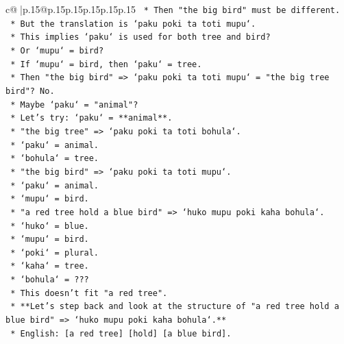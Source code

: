 \documentclass{article}
\begin{document}
{\begin{supertabular}{c@{$\;$}|p{.15\linewidth}@{}p{.15\linewidth}p{.15\linewidth}p{.15\linewidth}p{.15\linewidth}p{.15\linewidth}}
{{{\texttt{                        *   Then "the big bird" must be different.} \\
\texttt{                        *   But the translation is `paku poki ta toti mupu`.} \\
\texttt{                        *   This implies `paku` is used for both tree and bird?} \\
\texttt{                        *   Or `mupu` = bird?} \\
\texttt{                        *   If `mupu` = bird, then `paku` = tree.} \\
\texttt{                        *   Then "the big bird" => `paku poki ta toti mupu` = "the big tree bird"? No.} \\
\texttt{                        *   Maybe `paku` = "animal"?} \\
\texttt{                        *   Let's try: `paku` = **animal**.} \\
\texttt{                        *   "the big tree" => `paku poki ta toti bohula`.} \\
\texttt{                            *   `paku` = animal.} \\
\texttt{                            *   `bohula` = tree.} \\
\texttt{                        *   "the big bird" => `paku poki ta toti mupu`.} \\
\texttt{                            *   `paku` = animal.} \\
\texttt{                            *   `mupu` = bird.} \\
\texttt{                        *   "a red tree hold a blue bird" => `huko mupu poki kaha bohula`.} \\
\texttt{                            *   `huko` = blue.} \\
\texttt{                            *   `mupu` = bird.} \\
\texttt{                            *   `poki` = plural.} \\
\texttt{                            *   `kaha` = tree.} \\
\texttt{                            *   `bohula` = ???} \\
\texttt{                            *   This doesn't fit "a red tree".} \\
\texttt{                *   **Let's step back and look at the structure of "a red tree hold a blue bird" => `huko mupu poki kaha bohula`.**} \\
\texttt{                    *   English: {[}a red tree{]} {[}hold{]} {[}a blue bird{]}.} \\
}}}
\end{supertabular}}
\end{document}
